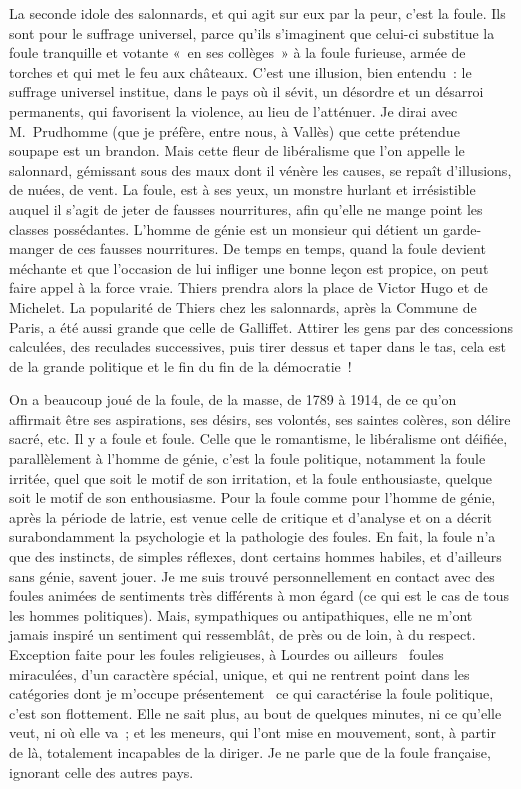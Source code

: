 \documentclass[french,twoside]{book} %
\begin{document}
La seconde idole des salonnards, et qui agit sur eux par la peur, c’est la foule. Ils sont pour le suffrage universel, parce qu’ils s’imaginent que celui-ci substitue la foule tranquille et votante « en ses collèges » à la foule furieuse, armée de torches et qui met le feu aux châteaux. C’est une illusion, bien entendu : le suffrage universel institue, dans le pays où il sévit, un désordre et un désarroi permanents, qui favorisent la violence, au lieu de l’atténuer. Je dirai avec M. Prudhomme (que je préfère, entre nous, à Vallès) que cette prétendue soupape est un brandon. Mais cette fleur de libéralisme que l’on appelle le salonnard, gémissant sous des maux dont il vénère les causes, se repaît d’illusions, de nuées, de vent. La foule, est à ses yeux, un monstre hurlant et irrésistible auquel il s’agit de jeter de fausses nourritures, afin qu’elle ne mange point les classes possédantes. L’homme de génie est un monsieur qui détient un garde-manger de ces fausses nourritures. De temps en temps, quand la foule devient méchante et que l’occasion de lui infliger une bonne leçon est propice, on peut faire appel à la force vraie. Thiers prendra alors la place de Victor Hugo et de Michelet. La popularité de Thiers chez les salonnards, après la Commune de Paris, a été aussi grande que celle de Galliffet. Attirer les gens par des concessions calculées, des reculades successives, puis tirer dessus et taper dans le tas, cela est de la grande politique et le fin du fin de la démocratie !\par
On a beaucoup joué de la foule, de la masse, de 1789 à 1914, de ce qu’on affirmait être ses aspirations, ses désirs, ses volontés, ses saintes colères, son délire sacré, etc. Il y a foule et foule. Celle que le romantisme, le libéralisme ont déifiée, parallèlement à l’homme de génie, c’est la foule politique, notamment la foule irritée, quel que soit le motif de son irritation, et la foule enthousiaste, quelque soit le motif de son enthousiasme. Pour la foule comme pour l’homme de génie, après la période de latrie, est venue celle de critique et d’analyse et on a décrit surabondamment la psychologie et la pathologie des foules. En fait, la foule n’a que des instincts, de simples réflexes, dont certains hommes habiles, et d’ailleurs sans génie, savent jouer. Je me suis trouvé personnellement en contact avec des foules animées de sentiments très différents à mon égard (ce qui est le cas de tous les hommes politiques). Mais, sympathiques ou antipathiques, elle ne m’ont jamais inspiré un sentiment qui ressemblât, de près ou de loin, à du respect. Exception faite pour les foules religieuses, à Lourdes ou ailleurs  foules miraculées, d’un caractère spécial, unique, et qui ne rentrent point dans les catégories dont je m’occupe présentement  ce qui caractérise la foule politique, c’est son flottement. Elle ne sait plus, au bout de quelques minutes, ni ce qu’elle veut, ni où elle va ; et les meneurs, qui l’ont mise en mouvement, sont, à partir de là, totalement incapables de la diriger. Je ne parle que de la foule française, ignorant celle des autres pays.\par
\end{document}
